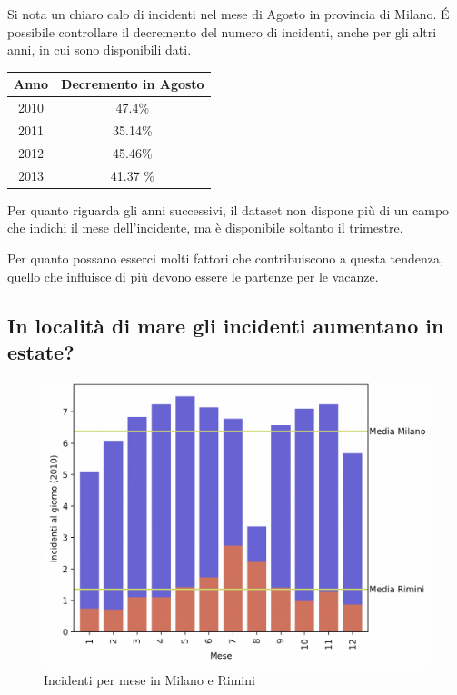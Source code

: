 \documentclass[a4paper]{report}
\begin{document}
Si nota un chiaro calo di incidenti nel mese di Agosto in provincia di Milano.
\'E possibile controllare il decremento del numero di incidenti, anche per gli altri anni, 
in cui sono disponibili dati.

\begin{center}
    \def\arraystretch{1.5}%
    \begin{tabular}{ |c|c| } 
    \hline
    Anno & Decremento in Agosto \\ 
    \hline
    2010 & 47.4\%  \\ 
    2011 & 35.14\% \\
    2012 & 45.46\% \\
    2013 & 41.37 \% \\
    \hline
    \end{tabular}
\end{center}

Per quanto riguarda gli anni successivi, il dataset non dispone più di un campo che indichi il mese 
dell'incidente, ma è disponibile soltanto il trimestre.


Per quanto possano esserci molti fattori che contribuiscono a questa tendenza, 
quello che influisce di più devono essere le partenze per le vacanze.

\subsection{In località di mare gli incidenti aumentano in estate?}

\begin{figure}
    \includegraphics[width=\linewidth]{../src/incidenti/incidenti_senza_coords/mese_incidenti/milano_rimini.png}
    \caption{Incidenti per mese in Milano e Rimini}
    \label{fig:milano_rimini}
\end{figure}
\end{document}
